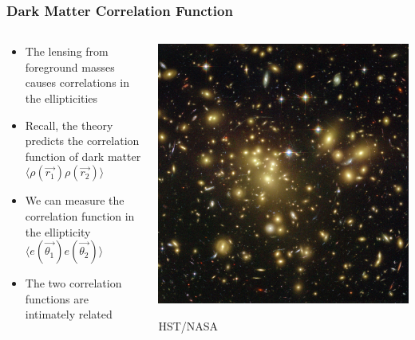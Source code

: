 \documentclass{beamer}
\begin{document}
\frame
{

    \frametitle{Dark Matter Correlation Function}


    \begin{columns}
        \begin{column}{0.5\textwidth}
            \begin{itemize}

                \item The lensing from foreground masses
                    causes correlations in the ellipticities

                \item Recall, the theory predicts the correlation function of
                    dark matter {\color{gold} $\langle \rho(\vec{r_1}) \rho(\vec{r_2})
                    \rangle$ }

                \item We can measure the correlation function in the
                    ellipticity {\color{gold} $\langle e(\vec{\theta_1})
                    e(\vec{\theta_2}) \rangle$ }

                \item The two correlation functions are intimately related

            \end{itemize}

        \end{column}
        \begin{column}{0.5\textwidth}
            \begin{center}
                \includegraphics[width=\textwidth]{abell-1689-hubble.jpg}
            \end{center}
            {\tiny HST/NASA}
        \end{column}

    \end{columns}


}
\end{document}
